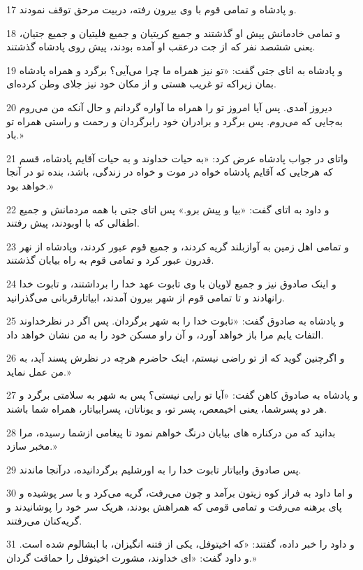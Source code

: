 \par 17 و پادشاه و تمامی قوم با وی بیرون رفته، دربیت مرحق توقف نمودند.
\par 18 و تمامی خادمانش پیش او گذشتند و جمیع کریتیان و جمیع فلیتیان و جمیع جتیان، یعنی ششصد نفر که از جت درعقب او آمده بودند، پیش روی پادشاه گذشتند.
\par 19 و پادشاه به اتای جتی گفت: «تو نیز همراه ما چرا می‌آیی؟ برگرد و همراه پادشاه بمان زیراکه تو غریب هستی و از مکان خود نیز جلای وطن کرده‌ای.
\par 20 دیروز آمدی. پس آیا امروز تو را همراه ما آواره گردانم و حال آنکه من می‌روم به‌جایی که می‌روم. پس برگرد و برادران خود رابرگردان و رحمت و راستی همراه تو باد.»
\par 21 واتای در جواب پادشاه عرض کرد: «به حیات خداوند و به حیات آقایم پادشاه، قسم که هرجایی که آقایم پادشاه خواه در موت و خواه در زندگی، باشد، بنده تو در آنجا خواهد بود.»
\par 22 و داود به اتای گفت: «بیا و پیش برو.» پس اتای جتی با همه مردمانش و جمیع اطفالی که با اوبودند، پیش رفتند.
\par 23 و تمامی اهل زمین به آوازبلند گریه کردند، و جمیع قوم عبور کردند، وپادشاه از نهر قدرون عبور کرد و تمامی قوم به راه بیابان گذشتند.
\par 24 و اینک صادوق نیز و جمیع لاویان با وی تابوت عهد خدا را برداشتند، و تابوت خدا رانهادند و تا تمامی قوم از شهر بیرون آمدند، ابیاتارقربانی می‌گذرانید.
\par 25 و پادشاه به صادوق گفت: «تابوت خدا را به شهر برگردان. پس اگر در نظرخداوند التفات یابم مرا باز خواهد آورد، و آن راو مسکن خود را به من نشان خواهد داد.
\par 26 و اگرچنین گوید که از تو راضی نیستم، اینک حاضرم هرچه در نظرش پسند آید، به من عمل نماید.»
\par 27 و پادشاه به صادوق کاهن گفت: «آیا تو رایی نیستی؟ پس به شهر به سلامتی برگرد و هر دو پسرشما، یعنی اخیمعص، پسر تو، و یوناتان، پسرابیاتار، همراه شما باشند.
\par 28 بدانید که من درکناره های بیابان درنگ خواهم نمود تا پیغامی ازشما رسیده، مرا مخبر سازد.»
\par 29 پس صادوق وابیاتار تابوت خدا را به اورشلیم برگردانیده، درآنجا ماندند.
\par 30 و اما داود به فراز کوه زیتون برآمد و چون می‌رفت، گریه می‌کرد و با سر پوشیده و پای برهنه می‌رفت و تمامی قومی که همراهش بودند، هریک سر خود را پوشانیدند و گریه‌کنان می‌رفتند.
\par 31 و داود را خبر داده، گفتند: «که اخیتوفل، یکی از فتنه انگیزان، با ابشالوم شده است. و داود گفت: «ای خداوند، مشورت اخیتوفل را حماقت گردان.»

